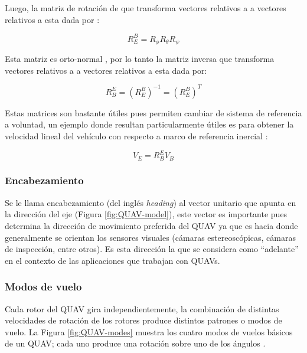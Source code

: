 Luego, la matriz de rotación  de que transforma vectores relativos a  a vectores relativos a  esta dada por \cite{multidrone2015modeling}:


\begin{equation}
    \label{eq:euler-transform}
    R_{E}^{B} = R_{\phi}R_{\theta}R_{\psi}
\end{equation}

Esta matriz es orto-normal \cite{eulerAngles}, por lo tanto la matriz inversa  que transforma vectores relativos a  a vectores relativos a  esta dada por:


\begin{equation}
    \label{eq:euler-transform-2}
    R_{B}^{E} = (R_{E}^{B})^{-1} = (R_{E}^{B})^{T}
\end{equation}

Estas matrices son bastante útiles pues permiten cambiar de sistema de referencia a voluntad, un ejemplo donde resultan particularmente útiles es para obtener la velocidad lineal del vehículo con respecto a marco de referencia inercial :

\begin{equation}
    \label{eq:velocity-world}
    V_{E} = R_{B}^{E} V_{B}
\end{equation}

\subsubsection{Encabezamiento}

Se le llama encabezamiento (del inglés \textit{heading}) al vector unitario que apunta en la dirección del eje  (Figura \ref{fig:QUAV-model}), este vector es importante pues determina la dirección de movimiento preferida del QUAV ya que es hacia donde generalmente se orientan los sensores visuales (cámaras estereoscópicas, cámaras de inspección, entre otros). Es esta dirección la que se considera como ``adelante'' en el contexto de las aplicaciones que trabajan con QUAVs.

\subsubsection{Modos de vuelo}

Cada rotor del QUAV gira independientemente, la combinación de distintas velocidades de rotación de los rotores produce distintos patrones o modos de vuelo. La Figura \ref{fig:QUAV-modes} muestra los cuatro modos de vuelos básicos de un QUAV; cada uno produce una rotación sobre uno de los ángulos \jim{\phi,\theta,\psi}.

